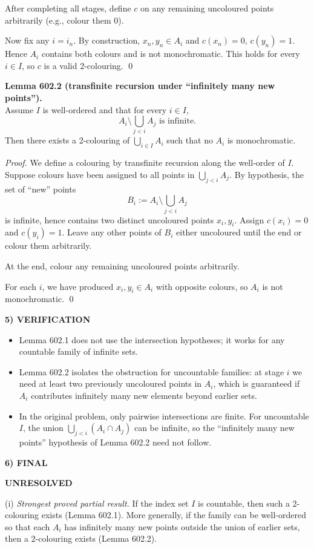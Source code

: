 After completing all stages, define $c$ on any remaining uncoloured points arbitrarily (e.g., colour them $0$).

Now fix any $i=i_n$. By construction, $x_n,y_n\in A_i$ and $c(x_n)=0$, $c(y_n)=1$. Hence $A_i$ contains both colours and is not monochromatic.
This holds for every $i\in I$, so $c$ is a valid 2-colouring. \qed

\medskip
\noindent\textbf{Lemma 602.2 (transfinite recursion under ``infinitely many new points'').}\\
Assume $I$ is well-ordered and that for every $i\in I$,
\[
A_i\setminus\bigcup_{j<i}A_j\text{ is infinite.}
\]
Then there exists a 2-colouring of $\bigcup_{i\in I}A_i$ such that no $A_i$ is monochromatic.

\noindent\emph{Proof.}
We define a colouring by transfinite recursion along the well-order of $I$.
Suppose colours have been assigned to all points in $\bigcup_{j<i}A_j$.
By hypothesis, the set of ``new'' points
\[
B_i:=A_i\setminus\bigcup_{j<i}A_j
\]
is infinite, hence contains two distinct uncoloured points $x_i,y_i$.
Assign $c(x_i)=0$ and $c(y_i)=1$.
Leave any other points of $B_i$ either uncoloured until the end or colour them arbitrarily.

At the end, colour any remaining uncoloured points arbitrarily.

For each $i$, we have produced $x_i,y_i\in A_i$ with opposite colours, so $A_i$ is not monochromatic. \qed

\noindent\textbf{5) VERIFICATION}\par
\begin{itemize}
\item Lemma 602.1 does not use the intersection hypotheses; it works for any countable family of infinite sets.
\item Lemma 602.2 isolates the obstruction for uncountable families: at stage $i$ we need at least two previously uncoloured points in $A_i$, which is guaranteed if $A_i$ contributes infinitely many new elements beyond earlier sets.
\item In the original problem, only pairwise intersections are finite. For uncountable $I$, the union $\bigcup_{j<i}(A_i\cap A_j)$ can be infinite, so the ``infinitely many new points'' hypothesis of Lemma 602.2 need not follow.
\end{itemize}

\noindent\textbf{6) FINAL}\par
\textbf{UNRESOLVED}

(i) \emph{Strongest proved partial result.} If the index set $I$ is countable, then such a 2-colouring exists (Lemma 602.1). More generally, if the family can be well-ordered so that each $A_i$ has infinitely many new points outside the union of earlier sets, then a 2-colouring exists (Lemma 602.2).

